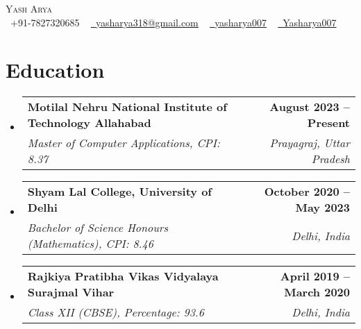 \documentclass[letterpaper,11pt]{article}
\makeatletter
\newcommand{\resumeSubheading}[4]{
  \vspace{-2pt}\item
    \begin{tabular*}{1.0\textwidth}[t]{l@{\extracolsep{\fill}}r}
      \textbf{#1} & \textbf{\small #2} \\
      \textit{\small#3} & \textit{\small #4} \\
    \end{tabular*}\vspace{-7pt}
}
\newcommand{\resumeSubHeadingListStart}{\begin{itemize}[leftmargin=0.0in, label={}]}
\newcommand{\resumeSubHeadingListEnd}{\end{itemize}}
\makeatother
\begin{document}
\begin{center}
    {\Huge \scshape Yash Arya}\\ \vspace{4pt}
    \small \raisebox{-0.1\height}\faPhone\ +91-7827320685 ~ \href{mailto:yasharya318@gmail.com}{\raisebox{-0.2\height}\faEnvelope\  \underline{yasharya318@gmail.com}} ~ 
    \href{https://www.linkedin.com/in/yasharya007/}{\raisebox{-0.2\height}\faLinkedin\ \underline{yasharya007}}  ~
    \href{https://github.com/Yasharya007}{\raisebox{-0.2\height}\faGithub\ \underline{Yasharya007}}
    \vspace{-8pt}
\end{center}


\section{Education}
  \resumeSubHeadingListStart
    \resumeSubheading
      {Motilal Nehru National Institute of Technology Allahabad}{August 2023 -- Present}
      {Master of Computer Applications, CPI: 8.37}{Prayagraj, Uttar Pradesh}
  \resumeSubheading
      {Shyam Lal College, University of Delhi}{October 2020 -- May 2023}
      {Bachelor of Science Honours (Mathematics), CPI: 8.46}{Delhi, India}
  \resumeSubheading
      {Rajkiya Pratibha Vikas Vidyalaya Surajmal Vihar}{April 2019 -- March 2020}
      {Class XII (CBSE),  Percentage: 93.6}{Delhi, India}
  \resumeSubHeadingListEnd



\end{document}
